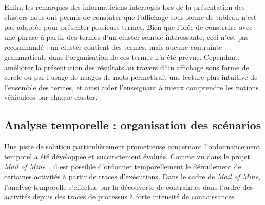 \bigskip

Enfin, les remarques des informaticiens interrogés lors de la présentation des clusters nous ont permis de constater que l'affichage sous forme de tableau n'est pas adaptée pour présenter plusieurs termes.
Bien que l'idée de construire avec une phrase à partir des termes d'un cluster semble intéressante, ceci n'est pas recommandé : un cluster contient des termes, mais aucune contrainte grammaticale dans l'organisation de ces termes n'a été prévue.
Cependant, améliorer la présentation des résultats au travers d'un affichage sous forme de cercle ou par l'usage de nuages de mots permettrait une lecture plus intuitive de l'ensemble des termes, et ainsi aider l'enseignant à mieux comprendre les notions véhiculées par chaque cluster.


\subsection{Analyse temporelle : organisation des scénarios}
\label{subsection:Conclusion:PerspectivesAmeliorations:AnalyseTemporelle}

Une piste de solution particulièrement prometteuse concernant l'ordonnancement temporel a été développée et succinctement évaluée.
Comme vu dans le projet \textit{Mail of Mine}~\cite{di2011mailofmine}\cite{di2011representing}, il est possible d'ordonner temporellement le déroulement de certaines activités à partir de traces d'exécutions.
Dans le cadre de \textit{Mail of Mine}, l'analyse temporelle s'effectue par la découverte de contraintes dans l'ordre des activités depuis des traces de processus à forte intensité de connaissances.

\bigskip

